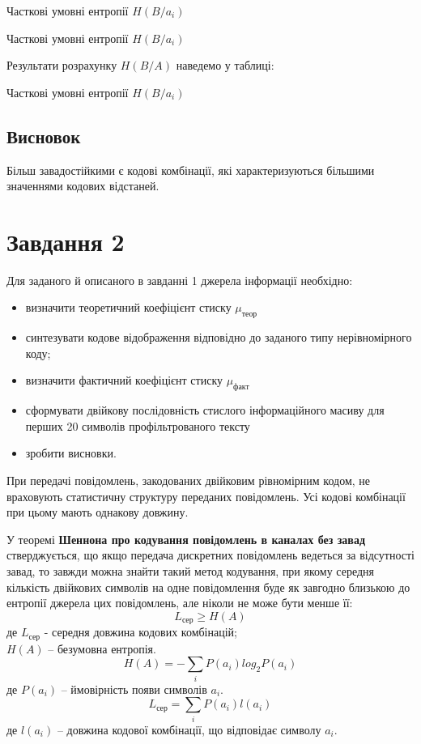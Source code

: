 \documentclass[a4paper,14pt]{extreport}
\begin{document}
\begin{table}[H]
	\caption{Часткові умовні ентропії $H(B/a_i)$}
	\centering	
	\resizebox{\columnwidth}{!}{%
		
     }
	\label{table:conditional_entropy}
\end{table}

\begin{table}[H]
	\caption{Часткові умовні ентропії $H(B/a_i)$}
	\centering	
		
	\label{table:entropy_sums}
\end{table}

Результати розрахунку $H(B/A)$ наведемо у таблиці:

\begin{table}[H]
	\caption{Часткові умовні ентропії $H(B/a_i)$}
	\centering	
		\resizebox{\columnwidth}{!}{%
		
}
	\label{table:total_entropy}
\end{table}
		
\subsection{Висновок}
Більш завадостійкими є кодові комбінації, які характеризуються більшими
значеннями кодових відстаней.
\newpage
\section{Завдання 2}
Для заданого й описаного в завданні 1 джерела інформації необхідно:
\begin{itemize}
	\item  визначити теоретичний коефіцієнт стиску $\mu_{\text{теор}}$ 
	\item синтезувати кодове відображення відповідно до	заданого типу нерівномірного коду;
	\item визначити фактичний коефіцієнт стиску $\mu_{\text{факт}}$ 
	\item сформувати двійкову послідовність стислого інформаційного масиву для перших 20 символів профільтрованого тексту
	\item зробити висновки.
\end{itemize}

При передачі повідомлень, закодованих двійковим рівномірним кодом, не враховують статистичну структуру переданих повідомлень. Усі кодові комбінації при цьому мають однакову довжину. 

У теоремі \textbf{Шеннона про кодування повідомлень в каналах без завад} стверджується, що якщо передача дискретних повідомлень ведеться за
відсутності завад, то завжди можна знайти такий метод кодування, при якому середня кількість двійкових символів на одне повідомлення буде як завгодно близькою до ентропії джерела цих повідомлень, але ніколи не може бути менше її:
$$L_{\text{сер}} \geq H(A)$$
де $L_{\text{сер}}$ - середня довжина кодових комбінацій;\\
$H(A)$ – безумовна ентропія.
$$H(A) = - \sum_{i}P(a_i)log_2P(a_i)$$
де $P(a_i)$ – ймовірність появи символів $a_i$.
$$L_{\text{сер}} = \sum_{i}P(a_i)l(a_i)$$
де $l(a_i)$ – довжина кодової комбінації, що відповідає символу $a_i$.
\end{document}
